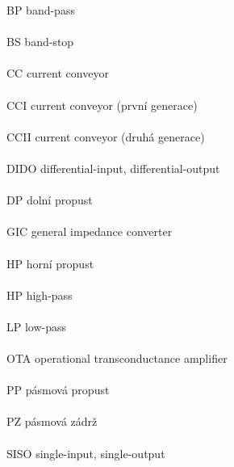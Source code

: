 BP \hfill band-pass \\ \\
BS \hfill band-stop \\ \\
CC \hfill current conveyor \\ \\
CCI \hfill current conveyor (první generace) \\ \\
CCII \hfill current conveyor (druhá generace) \\ \\
DIDO \hfill differential-input, differential-output \\ \\
DP \hfill dolní propust \\ \\
GIC \hfill general impedance converter \\ \\
HP \hfill horní propust \\ \\
HP \hfill high-pass \\ \\
LP \hfill low-pass \\ \\
OTA \hfill operational transconductance amplifier \\ \\
PP \hfill pásmová propust \\ \\
PZ \hfill pásmová zádrž \\ \\
SISO \hfill single-input, single-output \\ \\
